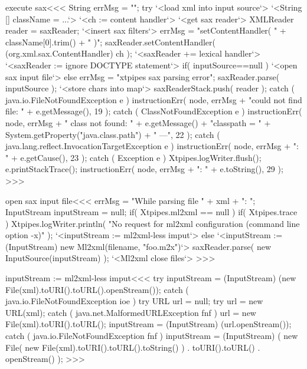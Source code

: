 \documentclass{article}
\begin{document}
{\<execute sax\><<<
String errMsg = "";
try{
   `<load xml into input source`>
   `<String [] className = ...`>
   `<ch := content handler`>
   `<get sax reader`>
   XMLReader reader = saxReader;
   `<insert sax filters`>
   errMsg = "setContentHandler( "
            + className[0].trim() + " )";
   saxReader.setContentHandler( (org.xml.sax.ContentHandler) ch );
   `<saxReader += lexical handler`>
   `<saxReader := ignore DOCTYPE statement`>
   if( inputSource==null ){
       `<open sax input file`>
   } else {
       errMsg = "xtpipes sax parsing error";
       saxReader.parse( inputSource );
   }
   `<store chars into map`>
   saxReaderStack.push( reader );
} catch ( java.io.FileNotFoundException e ){
   instructionErr( node, errMsg
                   + "could not find file: " + e.getMessage(), 19 );
} catch ( ClassNotFoundException e ){
   instructionErr( node, errMsg
                   + " class not found: "
                   + e.getMessage() + "\n classpath = "
                   + System.getProperty("java.class.path")
                   + " ---", 22 );
} catch ( java.lang.reflect.InvocationTargetException e ){
   instructionErr( node, errMsg + ": " + e.getCause(), 23 );
} catch ( Exception e ){
   Xtpipes.logWriter.flush();
   e.printStackTrace();
   instructionErr( node, errMsg + ": " + e.toString(), 29 );
}
>>>

\<open sax input file\><<<
errMsg = "While parsing file " + xml + ": ";
InputStream inputStream = null;
if( Xtpipes.ml2xml == null ){
   if( Xtpipes.trace ){
       Xtpipes.logWriter.println(
         "No request for ml2xml configuration (command line option -x)" );
   }
   `<inputStream := ml2xml-less imput`>
} else {
   `<inputStream := (InputStream) new Ml2xml(filename, "foo.m2x")`>
}
saxReader.parse( new InputSource(inputStream) );
`<Ml2xml close files`>
>>>

\<inputStream := ml2xml-less imput\><<<
try{
    inputStream = (InputStream) (new File(xml).toURI().toURL().openStream());
} catch ( java.io.FileNotFoundException ioe ){
    try{
       URL url = null;
       try {
           url = new URL(xml);
       } catch ( java.net.MalformedURLException fnf ){
           url = new File(xml).toURI().toURL();
       }
       inputStream = (InputStream) (url.openStream());
    } catch ( java.io.FileNotFoundException fnf ){
        inputStream = (InputStream)
           (
              new File( new File(xml).toURI().toURL().toString() )
              . toURI().toURL()
              . openStream()
           );
}   }
>>>





}
\end{document}
